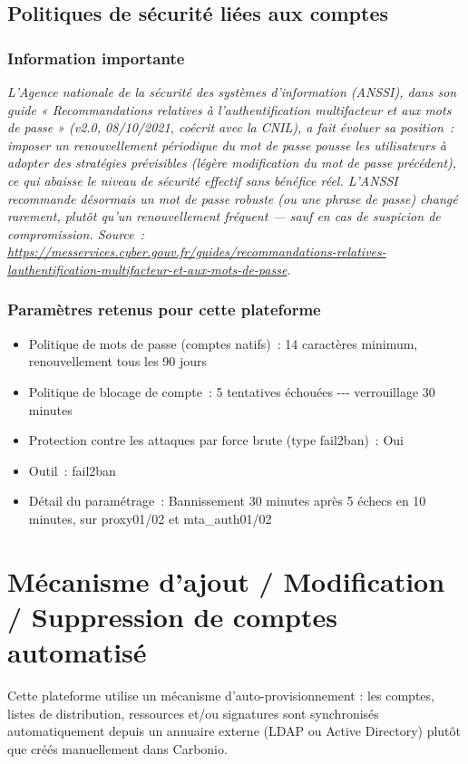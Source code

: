 \documentclass[11pt,a4paper]{report}
\begin{document}
\section{Politiques de sécurité liées aux comptes}

\subsection{Information importante}
\textit{L'Agence nationale de la sécurité des systèmes d'information (ANSSI), dans son guide « Recommandations relatives à l'authentification multifacteur et aux mots de passe » (v2.0, 08/10/2021, coécrit avec la CNIL), a fait évoluer sa position~: imposer un renouvellement périodique du mot de passe pousse les utilisateurs à adopter des stratégies prévisibles (légère modification du mot de passe précédent), ce qui abaisse le niveau de sécurité effectif sans bénéfice réel. L'ANSSI recommande désormais un mot de passe robuste (ou une phrase de passe) changé rarement, plutôt qu'un renouvellement fréquent --- sauf en cas de suspicion de compromission. Source~: \url{https://messervices.cyber.gouv.fr/guides/recommandations-relatives-lauthentification-multifacteur-et-aux-mots-de-passe}.}

\subsection{Paramètres retenus pour cette plateforme}
\begin{itemize}[nosep]
  \item Politique de mots de passe (comptes natifs)~: 14 caractères minimum, renouvellement tous les 90 jours
  \item Politique de blocage de compte~: 5 tentatives échouées -\allowbreak{}-\allowbreak{}-\allowbreak{} verrouillage 30 minutes
  \item Protection contre les attaques par force brute (type fail2ban)~: Oui
  \item Outil~: fail2ban
  \item Détail du paramétrage~: Bannissement 30 minutes après 5 échecs en 10 minutes, sur proxy01/02 et mta\_auth01/02
\end{itemize}

\chapter{Mécanisme d'ajout / Modification / Suppression de comptes automatisé}
Cette plateforme utilise un mécanisme d'auto-provisionnement : les comptes, listes de distribution, ressources et/ou signatures sont synchronisés automatiquement depuis un annuaire externe (LDAP ou Active Directory) plutôt que créés manuellement dans Carbonio.
\end{document}
